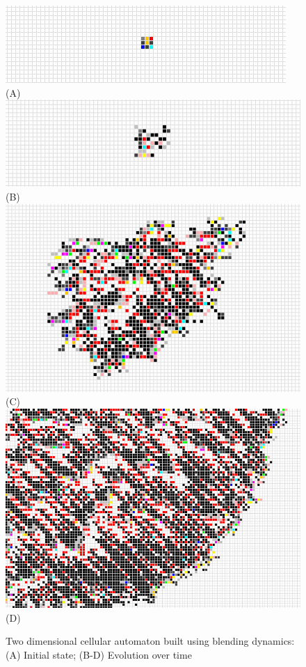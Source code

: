 \documentclass{AISB2008}
\begin{document}
\begin{figure}
\begin{center}
\includegraphics[width=\columnwidth]{initial2d.jpg}
(A)\\ \medskip
\includegraphics[width=\columnwidth]{3002d.jpg}
(B)\\ \medskip
\includegraphics[width=\columnwidth]{30002d.jpg}
(C)\\ \medskip
\includegraphics[width=\columnwidth]{300002d.jpg}
(D)\\
\end{center}
\caption{Two dimensional cellular automaton built using blending
  dynamics: (A) Initial state; (B-D) Evolution over time}
\end{figure}
\end{document}
